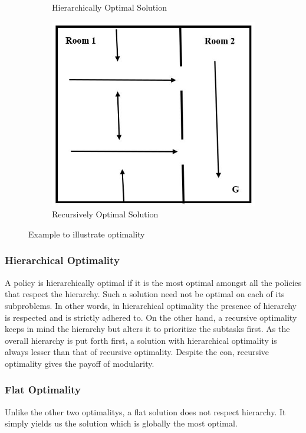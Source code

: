 \begin{figure}[ht]
\begin{subfigure}[b]{0.5\linewidth}
    \caption{Hierarchically Optimal Solution} 
    \vspace{4ex}
  \end{subfigure}%
  \begin{subfigure}[b]{0.5\linewidth}
    \centering
    \includegraphics[width=.5\linewidth]{images/img4.JPG} 
    \caption{Recursively Optimal Solution} 
    \vspace{4ex}
  \end{subfigure} 
    \caption{Example to illustrate optimality}

\end{figure}
\fi

\subsubsection*{Hierarchical Optimality}

A policy is hierarchically optimal if it is the most optimal amongst all the policies that respect the hierarchy. Such a solution need not be optimal on each of its subproblems. In other words, in hierarchical optimality the presence of hierarchy is respected and is strictly adhered to. On the other hand, a recursive optimality keeps in mind the hierarchy but alters it to prioritize the subtasks first. As the overall hierarchy is put forth first, a solution with hierarchical optimality is always lesser than that of recursive optimality. Despite the con, recursive optimality gives the payoff of modularity. 


\subsubsection*{Flat Optimality}

Unlike the other two optimalitys, a flat solution does not respect hierarchy. It simply yields us the solution which is globally the most optimal. 
